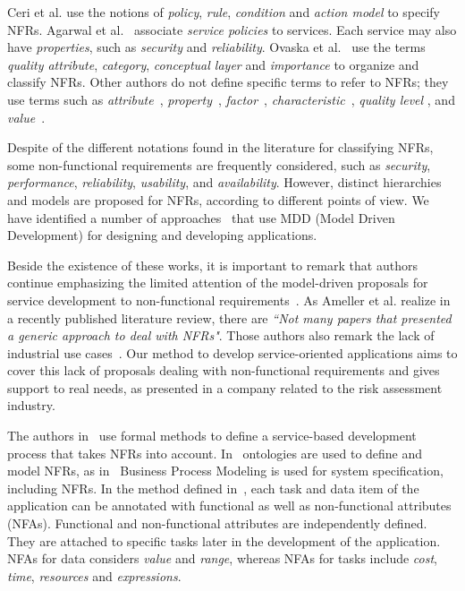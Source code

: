 \documentclass[12pt,twoside]{article}
\theoremstyle{plain}
\theoremstyle{plain}
\begin{document}
\begin{multicols}{2}
Ceri et al.\cite{CeriDMF07} use the notions of \textit{policy}, \textit{rule}, \textit{condition} and \textit{action model} to specify NFRs.
Agarwal et al.~\cite{AgarwalLS09} associate \textit{service policies} to services.
Each service may also have \textit{properties}, such as \textit{security} and \textit{reliability}.
Ovaska et al.~\cite{OvaskaEHPA10} use the terms \textit{quality attribute}, \textit{category}, \textit{conceptual layer} and \textit{importance} to organize and classify NFRs.
Other authors do not define specific terms to refer to NFRs; they use terms such as \textit{attribute}~\cite{ZhangPSP05,BasinDL06,JeongCL09},
\textit{property}~\cite{Fabra2011},
\textit{factor}~\cite{MohantyRP10,GutierrezRF10},
\textit{characteristic}~\cite{DiamadopoulouMPS08},
\textit{qual\-i\-ty level} \cite{ModicaTV09}, and
\textit{value}~\cite{ThissenW06,BasinDL06}.


Despite of the different notations found in the literature for classifying NFRs, some non-functional requirements are frequently considered, such as \textit{security}, \textit{performance}, \textit{reliability}, \textit{usability}, and \textit{availability}.
However, distinct hierarchies and models are proposed for NFRs, according to different points of view.
We have identified a number of approaches~\cite{DAmbrogio06,CholletL09,SchmelingCM11,BasinDL06,Fabra2011,OvaskaEHPA10} that use MDD (Model Driven Development) for designing and developing applications.

Beside the existence of these works, it is important to remark that authors continue emphasizing the limited attention of the model-driven proposals for service development to non-functional requirements~\cite{Ameller201542,Ameller2010}. As Ameller et al. realize in a recently published literature review, there are \textit{``Not many papers that presented a generic approach to deal with NFRs"}. Those authors also remark the lack of industrial use cases~\cite{Ameller201542}. 
Our method to develop service-oriented applications aims to cover this lack of proposals dealing with non-functional requirements and gives support to real needs, as presented in a company related to the risk assessment industry.


The authors in~\cite{ThissenW06,ZhangPSP05} use formal methods to define a service-based development process that takes NFRs into account.
In~\cite{AgarwalLS09,PastranaPK11} ontologies are used to define and model NFRs,
as  in~\cite{XiaoCZBOLH08,GutierrezRF10} Business Process Modeling is used for
system specification, including NFRs.
In the method defined in~\cite{XiaoCZBOLH08}, each task and data item of the application can be
annotated with functional as well as non-functional attributes (NFAs).
Functional and non-functional at\-tri\-butes are independently defined.
They are attached to specific tasks later in the development of the application.
NFAs for data considers \textit{value} and \textit{range}, whereas NFAs for tasks include \textit{cost}, \textit{time}, \textit{resources} and \textit{expressions}.


\end{multicols}
\end{document}
